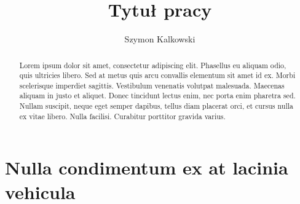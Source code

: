 \documentclass[12pt,a4paper]{article}
\title{Tytuł pracy}
\author{Szymon Kalkowski}
\begin{document}
\maketitle

\newpage

\begin{abstract}
    Lorem ipsum dolor sit amet, consectetur adipiscing elit. Phasellus eu aliquam odio, quis ultricies libero. Sed at metus quis arcu convallis elementum sit amet id ex. Morbi scelerisque imperdiet sagittis. Vestibulum venenatis volutpat malesuada. Maecenas aliquam in justo et aliquet. Donec tincidunt lectus enim, nec porta enim pharetra sed. Nullam suscipit, neque eget semper dapibus, tellus diam placerat orci, et cursus nulla ex vitae libero. Nulla facilisi. Curabitur porttitor gravida varius.
\end{abstract}

\tableofcontents

\newpage

\section{Nulla condimentum ex at lacinia vehicula}
\end{document}
